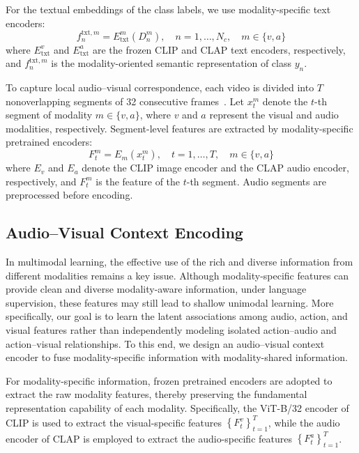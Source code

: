\documentclass[10pt,journal,twoside]{IEEEtran}
\begin{document}
For the textual embeddings of the class labels, we use modality-specific text encoders:
\begin{equation}
f_n^{\mathrm{txt},m}=E_{\mathrm{txt}}^m\left(D_n^m\right),\quad n=1,\ldots,N_c,\quad m\in\{v,a\}
\end{equation}
where $E_{\mathrm{txt}}^v$ and $E_{\mathrm{txt}}^a$ are the frozen CLIP and CLAP text encoders, respectively, and $f_n^{\mathrm{txt},m}$ is the modality-oriented semantic representation of class $y_n$.


To capture local audio--visual correspondence, each video is divided into $T$ nonoverlapping segments of 32 consecutive frames~\cite{32}. Let $x_t^m$ denote the $t$-th segment of modality $m\in\{v,a\}$, where $v$ and $a$ represent the visual and audio modalities, respectively. Segment-level features are extracted by modality-specific pretrained encoders:
\begin{equation}
F_t^m=E_m\left(x_t^m\right),\quad t=1,\ldots,T,\quad m\in\{v,a\}
\end{equation}
where $E_v$ and $E_a$ denote the CLIP image encoder and the CLAP audio encoder, respectively, and $F_t^m$ is the feature of the $t$-th segment. Audio segments are preprocessed before encoding.

\subsection{Audio–Visual Context Encoding}
In multimodal learning, the effective use of the rich and diverse information from different modalities remains a key issue. Although modality-specific features can provide clean and diverse modality-aware information, under language supervision, these features may still lead to shallow unimodal learning. More specifically, our goal is to learn the latent associations among audio, action, and visual features rather than independently modeling isolated action–audio and action–visual relationships. To this end, we design an audio–visual context encoder to fuse modality-specific information with modality-shared information.


For modality-specific information, frozen pretrained encoders are adopted to extract the raw modality features, thereby preserving the fundamental representation capability of each modality. Specifically, the ViT-B/32 encoder of CLIP is used to extract the visual-specific features $\left\{ F_t^v \right\}_{t=1}^T$, while the audio encoder of CLAP is employed to extract the audio-specific features $\left\{ F_t^a \right\}_{t=1}^T$.
\end{document}
